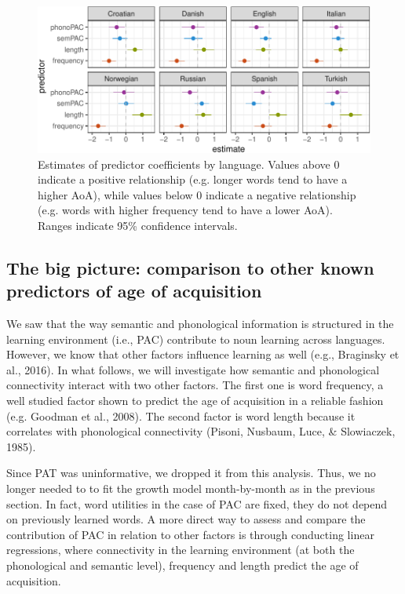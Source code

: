 \documentclass[10pt, letterpaper]{article}
\newenvironment{CodeChunk}{}{}
\begin{document}
\begin{CodeChunk}
\begin{figure}[h]

{\centering \includegraphics{figs/regressions_img-1} 

}

\caption{\label{fig:regressions_img}Estimates of predictor coefficients by language. Values above 0 indicate a positive relationship (e.g. longer words tend to have a higher AoA), while values below 0 indicate a negative relationship (e.g. words with higher frequency tend to have a lower AoA). Ranges indicate 95\% confidence intervals.}\label{fig:regressions_img}
\end{figure}
\end{CodeChunk}

\subsection{The big picture: comparison to other known predictors of age
of
acquisition}\label{the-big-picture-comparison-to-other-known-predictors-of-age-of-acquisition}

We saw that the way semantic and phonological information is structured
in the learning environment (i.e., PAC) contribute to noun learning
across languages. However, we know that other factors influence learning
as well (e.g., Braginsky et al., 2016). In what follows, we will
investigate how semantic and phonological connectivity interact with two
other factors. The first one is word frequency, a well studied factor
shown to predict the age of acquisition in a reliable fashion (e.g.
Goodman et al., 2008). The second factor is word length because it
correlates with phonological connectivity (Pisoni, Nusbaum, Luce, \&
Slowiaczek, 1985).

Since PAT was uninformative, we dropped it from this analysis. Thus, we
no longer needed to to fit the growth model month-by-month as in the
previous section. In fact, word utilities in the case of PAC are fixed,
they do not depend on previously learned words. A more direct way to
assess and compare the contribution of PAC in relation to other factors
is through conducting linear regressions, where connectivity in the
learning environment (at both the phonological and semantic level),
frequency and length predict the age of acquisition.
\end{document}
